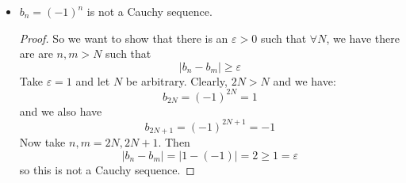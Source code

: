 \documentclass{article}
\begin{document}
\begin{itemize}
        \item $b_{n} = (-1)^{n}$ is not a Cauchy sequence.
            \begin{proof}
                So we want to show that there is an $\varepsilon > 0$ such that $\forall N$, we have there are are $n, m > N$ such that 
                    \begin{equation*}
                        \lvert b_{n} - b_{m} \rvert \geq \varepsilon
                    \end{equation*}
                Take $\varepsilon = 1$ and let $N$ be arbitrary. Clearly, $2N > N$ and we have:
                    \begin{equation*}
                        b_{2N} = (-1)^{2N} = 1
                    \end{equation*}
                and we also have 
                    \begin{equation*}
                        b_{2N + 1} = (-1)^{2N + 1} = -1
                    \end{equation*}
                Now take $n, m = 2N, 2N + 1$. Then
                    \begin{equation*}
                        \lvert b_{n} - b_{m} \rvert = \lvert 1 - (-1) \rvert = 2 \geq 1 = \varepsilon
                    \end{equation*}
                so this is not a Cauchy sequence.
            \end{proof}
    \end{itemize}
\end{document}
